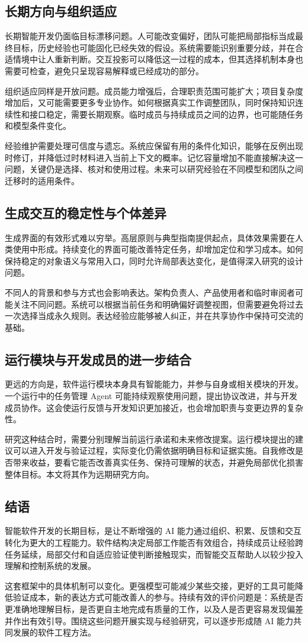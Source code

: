 \label{sec:outlook}
\subsection{长期方向与组织适应}
长期智能开发仍面临目标漂移问题。人可能改变偏好，团队可能把局部指标当成最终目标，历史经验也可能固化已经失效的假设。系统需要能识别重要分歧，并在合适情境中让人重新判断。交互投影可以降低这一过程的成本，但其选择机制本身也需要可检查，避免只呈现容易解释或已经成功的部分。

组织适应同样是开放问题。成员能力增强后，合理职责范围可能扩大；项目复杂度增加后，又可能需要更多专业协作。如何根据真实工作调整团队，同时保持知识连续性和接口稳定，需要长期观察。临时成员与持续成员之间的边界，也可能随任务和模型条件变化。

经验维护需要处理可信度与遗忘。系统应保留有用的条件化知识，能够在反例出现时修订，并降低过时材料进入当前上下文的概率。记忆容量增加不能直接解决这一问题，关键仍是选择、核对和使用过程。未来可以研究经验在不同模型和团队之间迁移时的适用条件。

\subsection{生成交互的稳定性与个体差异}
生成界面的有效形式难以穷举。高层原则与典型指南提供起点，具体效果需要在人类使用中形成。持续变化的界面可能改善特定任务，却增加定位和学习成本。如何保持稳定的对象语义与常用入口，同时允许局部表达变化，是值得深入研究的设计问题。

不同人的背景和参与方式也会影响表达。架构负责人、产品使用者和临时审阅者可能关注不同问题。系统可以根据当前任务和明确偏好调整视图，但需要避免将过去一次选择当成永久规则。表达经验应能够被人纠正，并在共享协作中保持可交流的基础。

\subsection{运行模块与开发成员的进一步结合}
更远的方向是，软件运行模块本身具有智能能力，并参与自身或相关模块的开发。一个运行中的任务管理 Agent 可能持续观察使用问题，提出协议改进，并与开发成员协作。这会使运行反馈与开发知识更加接近，也会增加职责与变更边界的复杂性。

研究这种结合时，需要分别理解当前运行承诺和未来修改提案。运行模块提出的建议可以进入开发与验证过程，实际变化仍需依据明确目标和证据实施。自我修改是否带来收益，要看它能否改善真实任务、保持可理解的状态，并避免局部优化损害整体目标。本文将其作为远期研究方向。

\subsection{结语}
智能软件开发的长期目标，是让不断增强的 AI 能力通过组织、积累、反馈和交互转化为更大的工程能力。软件结构决定局部工作能否有效组合，持续成员让经验跨任务延续，局部交付和自适应验证使判断接触现实，而智能交互帮助人以较少投入理解和控制系统的发展。

这套框架中的具体机制可以变化。更强模型可能减少某些交接，更好的工具可能降低验证成本，新的表达方式可能改善人的参与。持续有效的评价问题是：系统是否更准确地理解目标，是否更自主地完成有质量的工作，以及人是否更容易发现偏差并作出有效引导。围绕这些问题开展实现与经验研究，可以逐步形成随 AI 能力共同发展的软件工程方法。
